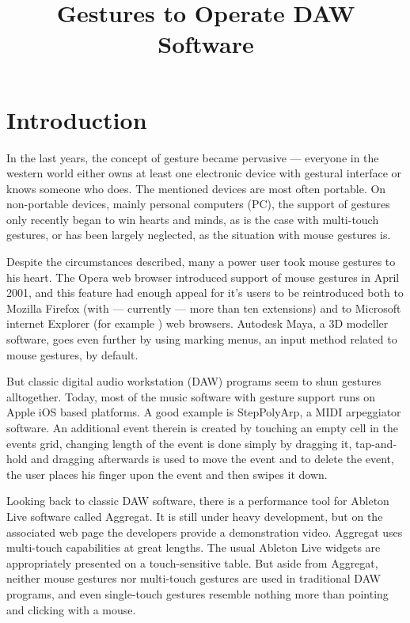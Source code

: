\documentclass{aes130}
\affiliation[1]{Universit\"{a}t Oldenburg, D-26111-Oldenburg, Germany}
\affiliation[2]{Fachhochschule Bielefeld (University of Applied Sciences), D-33602-Bielefeld, Germany}
\title{Gestures to Operate DAW Software}
\begin{document}
\maketitle

\section{Introduction}

In the last years, the concept of gesture became pervasive --- everyone in the western world either owns
at least one electronic device with gestural interface or knows someone who does. The mentioned devices
are most often portable. On non-portable devices, mainly personal computers (PC), the support of gestures
only recently began to win hearts and minds, as is the case with multi-touch gestures, or has been largely neglected,
as the situation with mouse gestures is.

Despite the circumstances described, many a power user took mouse gestures to his heart. The Opera web browser
introduced support of mouse gestures in April 2001\cite{WikipediaMouseGesture}, and this feature
had enough appeal for it's users to be reintroduced both to Mozilla Firefox (with --- currently --- more
than ten extensions\cite{FirefoxGestureExtensions}) and to Microsoft internet Explorer
(for example \cite{InternetExplorerGestures}) web browsers. Autodesk Maya, a 3D modeller software,
goes even further by using marking menus\cite{Kurtenbach:1994:ULP:259963.260376}, an input method related
to mouse gestures, by default.

But classic digital audio workstation (DAW) programs seem to shun gestures alltogether. Today,
most of the music software with gesture support runs on Apple iOS based platforms. A good example is
StepPolyArp\cite{StepPolyArp}, a MIDI arpeggiator software.
An additional event therein is created by touching an empty cell in the events grid\cite{StepPolyArpManual},
changing length of the event is done simply by dragging it, tap-and-hold and dragging afterwards is used to move the event
and to delete the event, the user places his finger upon the event and then swipes it down.

Looking back to classic DAW software, there is a performance tool for Ableton Live software called Aggregat\cite{Aggregat}.
It is still under heavy development, but on the associated web page the developers provide a demonstration video.
Aggregat uses multi-touch capabilities at great lengths. The usual Ableton Live widgets are appropriately presented
on a touch-sensitive table. But aside from Aggregat, neither mouse gestures nor multi-touch gestures are used
in traditional DAW programs, and even single-touch gestures resemble nothing more than pointing and clicking with a mouse.
\end{document}
